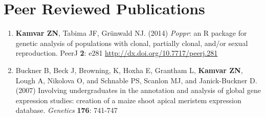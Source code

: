 \documentclass[11pt,letterpaper,sans]{moderncv} %
\begin{document}







\section{Peer Reviewed Publications}

\begin{enumerate}

    \item \textbf{Kamvar ZN}, Tabima JF, Gr\"unwald NJ. (2014) \textit{Poppr}: an
	R package for genetic analysis of populations with clonal, partially clonal,
	and/or sexual reproduction. PeerJ \textbf{2}: e281
	\url{http://dx.doi.org/10.7717/peerj.281}
	
	\vspace{6pt}

	\item Buckner B, Beck J, Browning, K, Hoxha E, Grantham L, \textbf{Kamvar ZN}, Lough A,
	Nikolova O, and Schnable PS, Scanlon MJ, and Janick-Buckner D. (2007) Involving
	undergraduates in the annotation and analysis of global gene expression studies:
	creation of a maize shoot apical meristem expression database. \textit{Genetics}
	\textbf{176}: 741-747

\end{enumerate}
\end{document}
